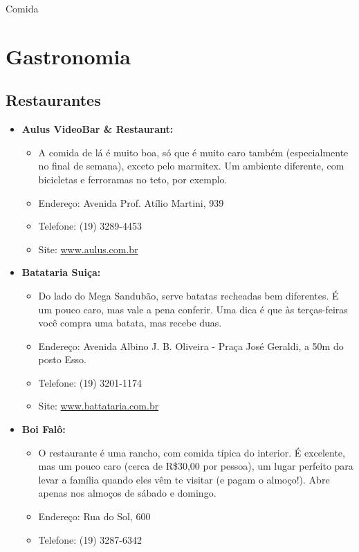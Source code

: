 \begin{story}{Comida}
\begin{itemize}
\end{itemize}

\section*{Gastronomia}

\subsection*{Restaurantes}

\begin{itemize}

\item \textbf{Aulus VideoBar \& Restaurant:}
\begin{itemize}
\item A comida de lá é muito boa, só que é muito caro também (especialmente no final de semana), exceto pelo marmitex. Um ambiente diferente, com bicicletas e ferroramas no teto, por exemplo.
\item Endereço: Avenida Prof. Atílio Martini, 939
\item Telefone: (19) 3289-4453
\item Site: \url{www.aulus.com.br}
\end{itemize}

\item \textbf{Batataria Suiça:}
\begin{itemize}
\item Do lado do Mega Sandubão, serve batatas recheadas bem diferentes. É um pouco caro, mas vale a pena conferir. Uma dica é que às terças-feiras você compra uma batata, mas recebe duas.
\item Endereço: Avenida Albino J. B. Oliveira - Praça José Geraldi, a 50m do posto Esso.
\item Telefone: (19) 3201-1174
\item Site: \url{www.battataria.com.br}
\end{itemize}

\item \textbf{Boi Falô:}
\begin{itemize}
\item O restaurante é uma rancho, com comida típica do interior. É excelente, mas um pouco caro (cerca de R\$30,00 por pessoa), um lugar perfeito para levar a família quando eles vêm te visitar (e pagam o almoço!). Abre apenas nos almoços de sábado e domingo.
\item Endereço: Rua do Sol, 600
\item Telefone: (19) 3287-6342
\end{itemize}


\end{itemize}
\end{story}
